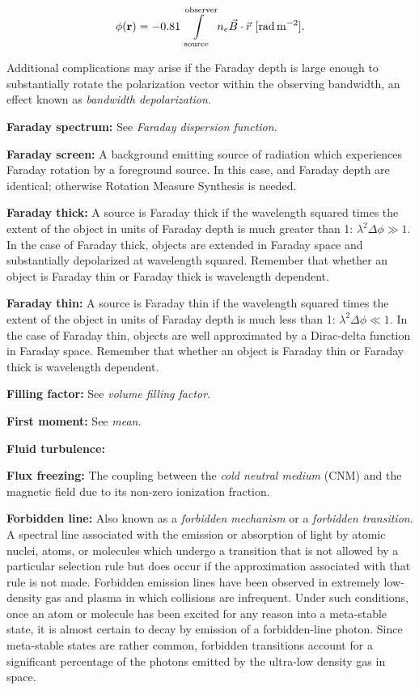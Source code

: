\documentclass[a4paper,10pt]{article}
\begin{document}
\begin{align*}
    \phi(\mathbf{r}) = -0.81 \int\limits_\mathrm{source}^\mathrm{observer}n_e\vec{B}\cdot\vec{{\rm }r} ~ [{\rm rad\,m^{-2}}].
\end{align*}

{\noindent}Additional complications may arise if the Faraday depth is large enough to substantially rotate the polarization vector within the observing bandwidth, an effect known as \textit{bandwidth depolarization}.

{\noindent}\textbf{Faraday spectrum:} See \textit{Faraday dispersion function}.

{\noindent}\textbf{Faraday screen:} A background emitting source of radiation which experiences Faraday rotation by a foreground source. In this case,  and Faraday depth are identical; otherwise Rotation Measure Synthesis is needed.

{\noindent}\textbf{Faraday thick:} A source is Faraday thick if the wavelength squared times the extent of the object in units of Faraday depth is much greater than 1: $\lambda^2\Delta\phi\gg1$. In the case of Faraday thick, objects are extended in Faraday space and substantially depolarized at wavelength squared. Remember that whether an object is Faraday thin or Faraday thick is wavelength dependent.

{\noindent}\textbf{Faraday thin:} A source is Faraday thin if the wavelength squared times the extent of the object in units of Faraday depth is much less than 1: $\lambda^2\Delta\phi\ll1$. In the case of Faraday thin, objects are well approximated by a Dirac-delta function in Faraday space. Remember that whether an object is Faraday thin or Faraday thick is wavelength dependent.

{\noindent}\textbf{Filling factor:} See \textit{volume filling factor}.

{\noindent}\textbf{First moment:} See \textit{mean}.

{\noindent}\textbf{Fluid turbulence:}

{\noindent}\textbf{Flux freezing:} The coupling between the \textit{cold neutral medium} (CNM) and the magnetic field due to its non-zero ionization fraction.

{\noindent}\textbf{Forbidden line:} Also known as a \textit{forbidden mechanism} or a \textit{forbidden transition}. A spectral line associated with the emission or absorption of light by atomic nuclei, atoms, or molecules which undergo a transition that is not allowed by a particular selection rule but does occur if the approximation associated with that rule is not made. Forbidden emission lines have been observed in extremely low-density gas and plasma in which collisions are infrequent. Under such conditions, once an atom or molecule has been excited for any reason into a meta-stable state, it is almost certain to decay by emission of a forbidden-line photon. Since meta-stable states are rather common, forbidden transitions account for a significant percentage of the photons emitted by the ultra-low density gas in space.
\end{document}
